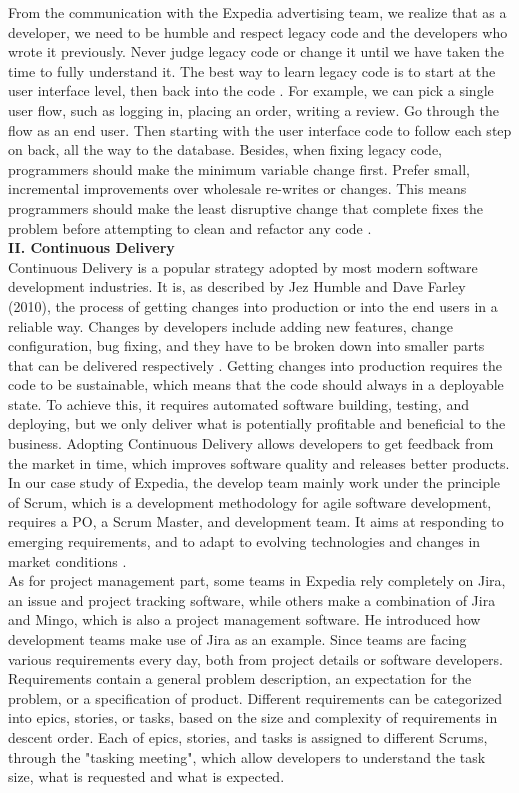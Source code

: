 \documentclass[11pt]{article}
\begin{document}
From the communication with the Expedia advertising team, we realize that as a developer, we need to be humble and respect legacy code and the developers who wrote it previously. Never judge legacy code or change it until we have taken the time to fully understand it. The best way to learn legacy code is to start at the user interface level, then back into the code \cite{no4}. For example, we can pick a single user flow, such as logging in, placing an order, writing a review. Go through the flow as an end user. Then starting with the user interface code to follow each step on back, all the way to the database. Besides, when fixing legacy code, programmers should make the minimum variable change \cite{no4} first. Prefer small, incremental improvements over wholesale re-writes or changes. This means programmers should make the least disruptive change that complete fixes the problem before attempting to clean and refactor any code \cite{no4}. \\[10px]
{\bf II. Continuous Delivery}\\[10px]
Continuous Delivery is a popular strategy adopted by most modern software development industries. It is, as described by Jez Humble and Dave Farley (2010), the process of getting changes into production or into the end users in a reliable way. Changes by developers include adding new features, change configuration, bug fixing, and they have to be broken down into smaller parts that can be delivered respectively \cite{no5}. Getting changes into production requires the code to be sustainable, which means that the code should always in a deployable state. To achieve this, it requires automated software building, testing, and deploying, but we only deliver what is potentially profitable and beneficial to the business. Adopting Continuous Delivery allows developers to get feedback from the market in time, which improves software quality and releases better products. \\[10px]
In our case study of Expedia, the develop team mainly work under the principle of Scrum, which is a development methodology for agile software development, requires a PO, a Scrum Master, and development team. It aims at responding to emerging requirements, and to adapt to evolving technologies and changes in market conditions \cite{no6}. \\[10px]
As for project management part, some teams in Expedia rely completely on Jira, an issue and project tracking software, while others make a combination of Jira and Mingo, which is also a project management software. He introduced how development teams make use of Jira as an example. Since teams are facing various requirements every day, both from project details or software developers. Requirements contain a general problem description, an expectation for the problem, or a specification of product. Different requirements can be categorized into epics, stories, or tasks, based on the size and complexity of requirements in descent order. Each of epics, stories, and tasks is assigned to different Scrums, through the "tasking meeting", which allow developers to understand the task size, what is requested and what is expected. \\[10px]
\end{document}
